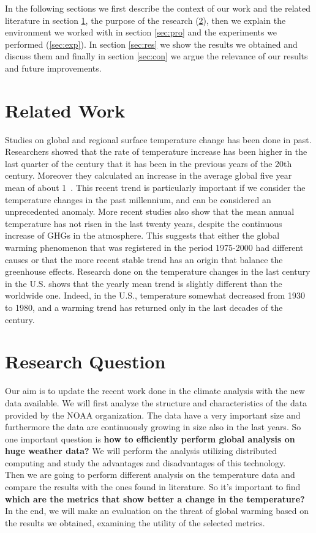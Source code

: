 \documentclass{vldb}
\begin{document}
In the following sections we first describe the context of our work and the related literature in section \ref{sec:rel}, the purpose of the research (\ref{sec:question}), then we explain the environment we worked with in section \ref{sec:pro} and the experiments we performed (\ref{sec:exp}). In section \ref{sec:res} we show the results we obtained and discuss them and finally in section \ref{sec:con} we argue the relevance of our results and future improvements.

\FloatBarrier

\section{Related Work}
\label{sec:rel}
Studies on global and regional surface temperature change has been done in past. Researchers showed that the rate of temperature increase has been higher in the last quarter of the century that it has been in the previous years of the 20th century. Moreover they calculated an increase in the average global five year mean of about 1\celsius~\cite{hansen1999giss}. This recent trend is particularly important if we consider the temperature changes in the past millennium, and can be considered an unprecedented anomaly\cite{mann1999northern}. More recent studies also show that the mean annual temperature has not risen in the last twenty years, despite the continuous increase of GHGs in the atmosphere\cite{kosaka2013recent}. This suggests that either the global warming phenomenon that was registered in the period 1975-2000 had different causes or that the more recent stable trend has an origin that balance the greenhouse effects.
Research done on the temperature changes in the last century in the U.S. shows that the yearly mean trend is slightly different than the worldwide one. Indeed, in the U.S., temperature somewhat decreased from 1930 to 1980, and a warming trend has returned only in the last decades of the century\cite{hansen1999giss}.

\FloatBarrier

\section{Research Question}
\label{sec:question}
Our aim is to update the recent work done in the climate analysis with the new data available. We will first analyze the structure and characteristics of the data provided by the NOAA organization.
The data have a very important size and furthermore the data are continuously growing in size also in the last years. So one important question is \textbf{how to efficiently perform global analysis on huge weather data?} We will perform the analysis utilizing distributed computing and study the advantages and disadvantages of this technology.\\
Then we are going to perform different analysis on the temperature data and compare the results with the ones found in literature. So it's important to find \textbf{which are the metrics that show better a change in the temperature?} In the end, we will make an evaluation on the threat of global warming based on the results we obtained, examining the utility of the selected metrics. \\
\end{document}
